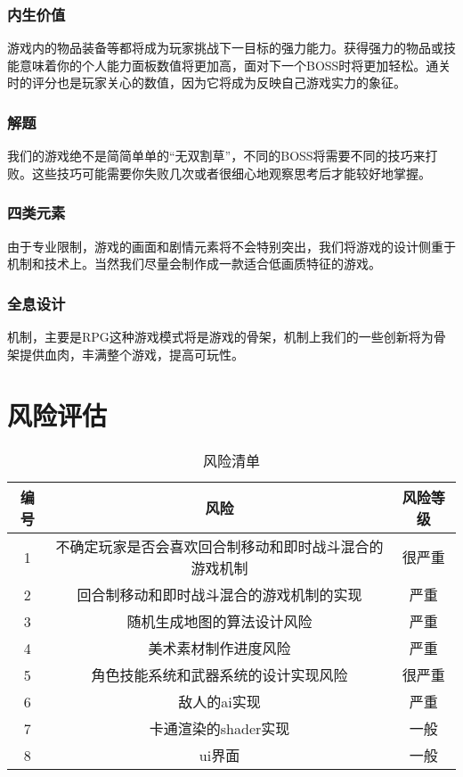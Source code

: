\documentclass{article}
\begin{document}
\subsubsection{内生价值}
游戏内的物品装备等都将成为玩家挑战下一目标的强力能力。获得强力的物品或技能意味着你的个人能力面板数值将更加高，面对下一个BOSS时将更加轻松。通关时的评分也是玩家关心的数值，因为它将成为反映自己游戏实力的象征。
\subsubsection{解题}
我们的游戏绝不是简简单单的“无双割草”，不同的BOSS将需要不同的技巧来打败。这些技巧可能需要你失败几次或者很细心地观察思考后才能较好地掌握。
\subsubsection{四类元素}
由于专业限制，游戏的画面和剧情元素将不会特别突出，我们将游戏的设计侧重于机制和技术上。当然我们尽量会制作成一款适合低画质特征的游戏。
\subsubsection{全息设计}
机制，主要是RPG这种游戏模式将是游戏的骨架，机制上我们的一些创新将为骨架提供血肉，丰满整个游戏，提高可玩性。
\newpage
\section{风险评估}
\begin{table}[htbp]
\centering
\caption{风险清单}
\begin{tabular}{|c|c|c|}
	\hline
	编号 & 风险 & 风险等级 \\
	\hline
	1 & 不确定玩家是否会喜欢回合制移动和即时战斗混合的游戏机制 & 很严重 \\
	\hline
	2 & 回合制移动和即时战斗混合的游戏机制的实现 & 严重 \\
	\hline
	3 & 随机生成地图的算法设计风险 & 严重 \\
	\hline
	4 & 美术素材制作进度风险 & 严重 \\
	\hline
	5 & 角色技能系统和武器系统的设计实现风险 & 很严重 \\
	\hline
	6 & 敌人的ai实现 & 严重 \\
	\hline
	7 & 卡通渲染的shader实现 & 一般 \\
	\hline
	8 & ui界面 & 一般 \\
	\hline
\end{tabular}
\end{table}
\end{document}
